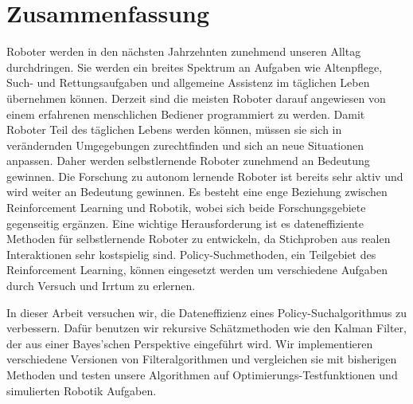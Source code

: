 
\chapter*{Zusammenfassung}
Roboter werden in den nächsten Jahrzehnten zunehmend unseren
Alltag durchdringen. Sie werden ein breites Spektrum an
Aufgaben wie Altenpflege, Such- und Rettungsaufgaben und allgemeine
Assistenz im täglichen Leben übernehmen können.
Derzeit sind die meisten Roboter darauf angewiesen von einem
erfahrenen menschlichen Bediener programmiert zu werden.
Damit Roboter Teil des täglichen Lebens werden können, müssen sie
sich in verändernden Umgegebungen zurechtfinden und sich an
neue Situationen anpassen.
Daher werden selbstlernende Roboter zunehmend an Bedeutung gewinnen.
Die Forschung zu autonom lernende Roboter ist
bereits sehr aktiv und wird weiter an Bedeutung gewinnen.
Es besteht eine enge Beziehung zwischen Reinforcement Learning und
Robotik, wobei sich beide Forschungsgebiete gegenseitig ergänzen.
Eine wichtige Herausforderung ist es dateneffiziente Methoden
für selbstlernende Roboter zu entwickeln, da Stichproben
aus realen Interaktionen sehr kostspielig sind.
Policy-Suchmethoden, ein Teilgebiet des Reinforcement Learning,
können eingesetzt werden um verschiedene Aufgaben durch Versuch und Irrtum
zu erlernen.

In dieser Arbeit versuchen wir, die Dateneffizienz eines
Policy-Suchalgorithmus zu verbessern.
Dafür benutzen wir rekursive Schätzmethoden wie den Kalman
Filter, der aus einer Bayes'schen Perspektive eingeführt wird.
Wir implementieren verschiedene Versionen von Filteralgorithmen
und vergleichen sie mit bisherigen Methoden
und testen unsere Algorithmen auf Optimierungs-Testfunktionen
und simulierten Robotik Aufgaben.


